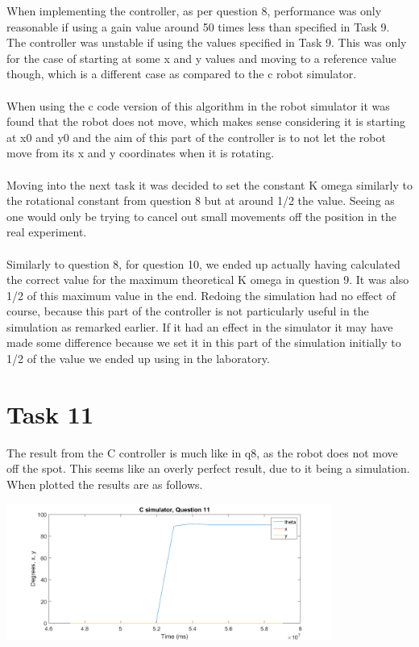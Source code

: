 \documentclass[a4paper,12pt,oneside,onecolumn]{article} %
\begin{document}
When implementing the controller, as per question 8, performance was only reasonable if using a gain value around 50 times less than specified in Task 9. The controller was unstable if using the values specified in Task 9. This was only for the case of starting at some x and y values and moving to a reference value though, which is a different case as compared to the c robot simulator.\\
\\
When using the c code version of this algorithm in the robot simulator it was found that the robot does not move, which makes sense considering it is starting at x0 and y0 and the aim of this part of the controller is to not let the robot move from its x and y coordinates when it is rotating.
\\
\\
Moving into the next task it was decided to set the constant K omega similarly to the rotational constant from question 8 but at around 1/2 the value. Seeing as one would only be trying to cancel out small movements off the position in the real experiment.\\
\\
Similarly to question 8, for question 10, we ended up actually having calculated the correct value for the maximum theoretical K omega in question 9. It was also 1/2 of this maximum value in the end. Redoing the simulation had no effect of course, because this part of the controller is not particularly useful in the simulation as remarked earlier. If it had an effect in the simulator it may have made some difference because we set it in this part of the simulation initially to 1/2 of the value we ended up using in the laboratory.\\
\section*{Task 11}

The result from the C controller is much like in q8, as the robot does not move off the spot.
This seems like an overly perfect result, due to it being a simulation.\\
When plotted the results are as follows.\\
  \begin{center}
  \includegraphics[width = 0.8\textwidth]{q11simulation}
 \end{center}
 
\end{document}
